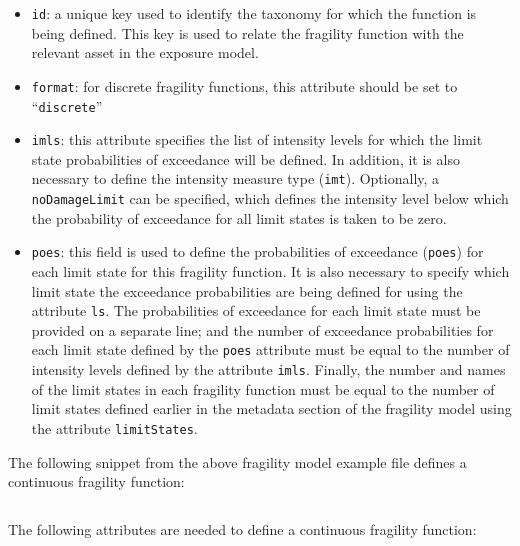 \begin{itemize}

    \item \Verb+id+: a unique key used to identify the \gls{taxonomy} for 
    which the function is being defined. This key is used to relate the 
    \gls{fragility function} with the relevant \gls{asset} in the 
    \gls{exposure model}.

    \item \Verb+format+: for discrete fragility functions, this attribute 
    should be set to ``\Verb+discrete+''

    \item \Verb+imls+: this attribute specifies the list of intensity levels
    for which the limit state probabilities of exceedance will be defined. 
    In addition, it is also necessary to define the intensity measure type 
    (\Verb+imt+). Optionally, a \Verb+noDamageLimit+ can be specified, which 
    defines the intensity level below which the probability of exceedance 
    for all limit states is taken to be zero.

    \item \Verb+poes+: this field is used to define the probabilities of 
    exceedance (\Verb+poes+) for each limit state for this 
    \gls{fragility function}. It is also necessary to specify which limit 
    state the exceedance probabilities are being defined for using the 
    attribute \Verb+ls+. The probabilities of exceedance for each limit state
    must be provided on a separate line; and the number of exceedance 
    probabilities for each limit state defined by the \Verb+poes+ attribute 
    must be equal to the number of intensity levels defined by the attribute 
    \Verb+imls+. Finally, the number and names of the limit states in each 
    fragility function must be equal to the number of limit states defined 
    earlier in the metadata section of the \gls{fragility model} using the 
    attribute \Verb+limitStates+.

\end{itemize}



The following snippet from the above \gls{fragility model} example file
defines a continuous \gls{fragility function}:

\inputminted[firstline=19,firstnumber=19,lastline=25,fontsize=\footnotesize,frame=single,linenos,bgcolor=lightgray]{xml}{oqum/risk/Verbatim/input_fragility.xml}

The following attributes are needed to define a continuous \gls{fragility function}:

